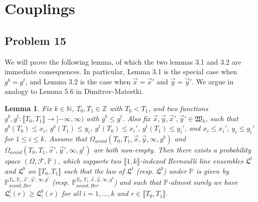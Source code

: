 \documentclass[12pt]{article}
\newtheorem*{lemma*}{Lemma}
\begin{document}
\section{Couplings}

	\subsection*{Problem 15}
	
	We will prove the following lemma, of which the two lemmas 3.1 and 3.2 are immediate consequences. In particular, Lemma 3.1 is the special case when $g^b = g^t$, and Lemma 3.2 is the case when $\vec{x} = \vec{x}'$ and $\vec{y} = \vec{y}'$. We argue in analogy to Lemma 5.6 in Dimitrov-Matestki.
	
	\begin{lemma*}
		Fix $k \in \mathbb{N}$, $T_0, T_1 \in \mathbb{Z}$ with $T_0 < T_1$, and two functions $g^b, g^t: \llbracket T_0, T_1 \rrbracket  \rightarrow [-\infty, \infty)$ with $g^b\leq g^t$. Also fix $\vec{x}, \vec{y}, \vec{x}', \vec{y}' \in \mathfrak{W}_k$, such that $g^b(T_0)\leq x_i$, $g^b(T_1)\leq y_i$, $g^t(T_0)\leq x_i'$, $g^t(T_1)\leq y_i'$, and $x_i\leq x_i'$, $y_i\leq y_i'$ for $1\leq i\leq k$. Assume that $\Omega_{avoid}(T_0, T_1, \vec{x}, \vec{y}, \infty,g^b)$ and $\Omega_{avoid}(T_0, T_1, \vec{x}', \vec{y}', \infty,g^t)$ are both non-empty. Then there exists a probability space $(\Omega, \mathcal{F}, \mathbb{P})$, which supports two $\llbracket 1, k \rrbracket$-indexed Bernoulli line ensembles $\mathfrak{L}^t$ and $\mathfrak{L}^b$ on $\llbracket T_0, T_1 \rrbracket$ such that the law of $\mathfrak{L}^{t}$ {\big (}resp. $\mathfrak{L}^b${\big )} under $\mathbb{P}$ is given by $\mathbb{P}_{avoid, Ber}^{T_0, T_1, \vec{x}', \vec{y}', \infty, g^t}$ {\big (}resp. $\mathbb{P}_{avoid, Ber}^{T_0, T_1, \vec{x}, \vec{y}, \infty, g^b}${\big )} and such that $\mathbb{P}$-almost surely we have $\mathfrak{L}_i^t(r) \geq \mathfrak{L}^b_i(r)$ for all $i = 1,\dots, k$ and $r \in \llbracket T_0, T_1 \rrbracket$.
	\end{lemma*}
\end{document}
